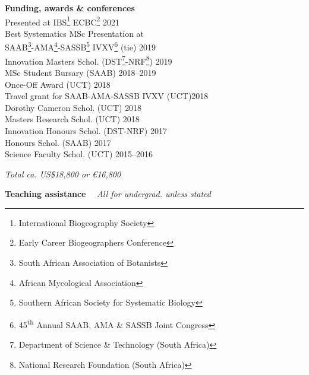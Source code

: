 \documentclass[10pt]{article}
\begin{document}
\begin{multicols}{2}

\textbf{Funding, awards \& conferences}\\ %

Presented at IBS\footnote{International Biogeography
  Society} ECBC\footnote{Early Career
  Biogeographers Conference}                       \hfill {\small       2021} \\
Best Systematics MSc Presentation at \\
\hspace{2em} SAAB\footnote{South African
  Association of Botanists}-AMA\footnote{African
  Mycological Association}-SASSB\footnote{Southern
  African Society for Systematic Biology}
  IVXV\footnote{45\textsuperscript{th} Annual SAAB,
  AMA \& SASSB Joint Congress} (tie)               \hfill {\small       2019} \\
Innovation Masters Schol. {\small (DST\footnote{
  Department of Science \& Technology (South
  Africa)}-NRF\footnote{National Research
  Foundation (South Africa)})}                     \hfill {\small       2019} \\
MSc Student Bursary {\small (SAAB)}                \hfill {\small 2018--2019} \\
Once-Off Award {\small (UCT)}                      \hfill {\small       2018} \\
Travel grant for SAAB-AMA-SASSB IVXV {\small (UCT)}\hfill {\small       2018} \\
Dorothy Cameron Schol. {\small (UCT)}              \hfill {\small       2018} \\
Masters Research Schol. {\small (UCT)}             \hfill {\small       2018} \\
Innovation Honours Schol. {\small (DST-NRF)}       \hfill {\small       2017} \\
Honours Schol. {\small (SAAB)}                     \hfill {\small       2017} \\
Science Faculty Schol. {\small (UCT)}              \hfill {\small 2015--2016}

\begin{center}
  \textit{Total ca. US\$18,800 or €16,800}
\end{center}

\columnbreak

\textbf{Teaching assistance} %
  ~~{\small \textmd{\textit{All for undergrad. unless stated}}}\\


\end{multicols}
\end{document}
